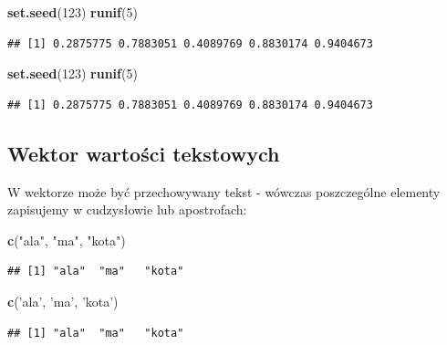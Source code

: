 \documentclass[]{book}
\newenvironment{Shaded}{\begin{snugshade}}{\end{snugshade}}
\newcommand{\KeywordTok}[1]{\textcolor[rgb]{0.13,0.29,0.53}{\textbf{#1}}}
\newcommand{\DecValTok}[1]{\textcolor[rgb]{0.00,0.00,0.81}{#1}}
\newcommand{\StringTok}[1]{\textcolor[rgb]{0.31,0.60,0.02}{#1}}
\newcommand{\NormalTok}[1]{#1}
\begin{document}
\begin{Shaded}
\begin{Highlighting}[]
\KeywordTok{set.seed}\NormalTok{(}\DecValTok{123}\NormalTok{)}
\KeywordTok{runif}\NormalTok{(}\DecValTok{5}\NormalTok{)}
\end{Highlighting}
\end{Shaded}

\begin{verbatim}
## [1] 0.2875775 0.7883051 0.4089769 0.8830174 0.9404673
\end{verbatim}

\begin{Shaded}
\begin{Highlighting}[]
\KeywordTok{set.seed}\NormalTok{(}\DecValTok{123}\NormalTok{)}
\KeywordTok{runif}\NormalTok{(}\DecValTok{5}\NormalTok{)}
\end{Highlighting}
\end{Shaded}

\begin{verbatim}
## [1] 0.2875775 0.7883051 0.4089769 0.8830174 0.9404673
\end{verbatim}

\subsection{Wektor wartości
tekstowych}\label{wektor-wartosci-tekstowych}

W wektorze może być przechowywany tekst - wówczas poszczególne elementy
zapisujemy w cudzysłowie lub apostrofach:

\begin{Shaded}
\begin{Highlighting}[]
\KeywordTok{c}\NormalTok{(}\StringTok{"ala"}\NormalTok{, }\StringTok{"ma"}\NormalTok{, }\StringTok{"kota"}\NormalTok{)}
\end{Highlighting}
\end{Shaded}

\begin{verbatim}
## [1] "ala"  "ma"   "kota"
\end{verbatim}

\begin{Shaded}
\begin{Highlighting}[]
\KeywordTok{c}\NormalTok{(}\StringTok{'ala'}\NormalTok{, }\StringTok{'ma'}\NormalTok{, }\StringTok{'kota'}\NormalTok{)}
\end{Highlighting}
\end{Shaded}

\begin{verbatim}
## [1] "ala"  "ma"   "kota"
\end{verbatim}
\end{document}
